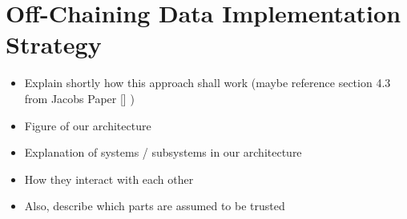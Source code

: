 \section{Off-Chaining Data Implementation Strategy}

\begin{itemize}
\item Explain shortly how this approach shall work (maybe reference section 4.3 from Jacobs Paper [\cite{Eberhardt2017}] )
\end{itemize}

\begin{itemize}
\item Figure of our architecture
\item Explanation of systems / subsystems in our architecture
\item How they interact with each other
\item Also, describe which parts are assumed to be trusted
\end{itemize}





